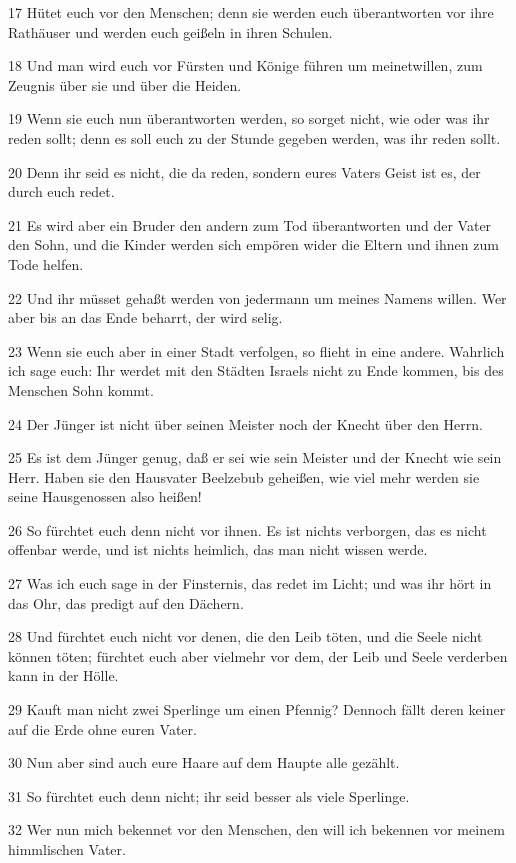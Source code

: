 \par 17 Hütet euch vor den Menschen; denn sie werden euch überantworten vor ihre Rathäuser und werden euch geißeln in ihren Schulen.
\par 18 Und man wird euch vor Fürsten und Könige führen um meinetwillen, zum Zeugnis über sie und über die Heiden.
\par 19 Wenn sie euch nun überantworten werden, so sorget nicht, wie oder was ihr reden sollt; denn es soll euch zu der Stunde gegeben werden, was ihr reden sollt.
\par 20 Denn ihr seid es nicht, die da reden, sondern eures Vaters Geist ist es, der durch euch redet.
\par 21 Es wird aber ein Bruder den andern zum Tod überantworten und der Vater den Sohn, und die Kinder werden sich empören wider die Eltern und ihnen zum Tode helfen.
\par 22 Und ihr müsset gehaßt werden von jedermann um meines Namens willen. Wer aber bis an das Ende beharrt, der wird selig.
\par 23 Wenn sie euch aber in einer Stadt verfolgen, so flieht in eine andere. Wahrlich ich sage euch: Ihr werdet mit den Städten Israels nicht zu Ende kommen, bis des Menschen Sohn kommt.
\par 24 Der Jünger ist nicht über seinen Meister noch der Knecht über den Herrn.
\par 25 Es ist dem Jünger genug, daß er sei wie sein Meister und der Knecht wie sein Herr. Haben sie den Hausvater Beelzebub geheißen, wie viel mehr werden sie seine Hausgenossen also heißen!
\par 26 So fürchtet euch denn nicht vor ihnen. Es ist nichts verborgen, das es nicht offenbar werde, und ist nichts heimlich, das man nicht wissen werde.
\par 27 Was ich euch sage in der Finsternis, das redet im Licht; und was ihr hört in das Ohr, das predigt auf den Dächern.
\par 28 Und fürchtet euch nicht vor denen, die den Leib töten, und die Seele nicht können töten; fürchtet euch aber vielmehr vor dem, der Leib und Seele verderben kann in der Hölle.
\par 29 Kauft man nicht zwei Sperlinge um einen Pfennig? Dennoch fällt deren keiner auf die Erde ohne euren Vater.
\par 30 Nun aber sind auch eure Haare auf dem Haupte alle gezählt.
\par 31 So fürchtet euch denn nicht; ihr seid besser als viele Sperlinge.
\par 32 Wer nun mich bekennet vor den Menschen, den will ich bekennen vor meinem himmlischen Vater.
